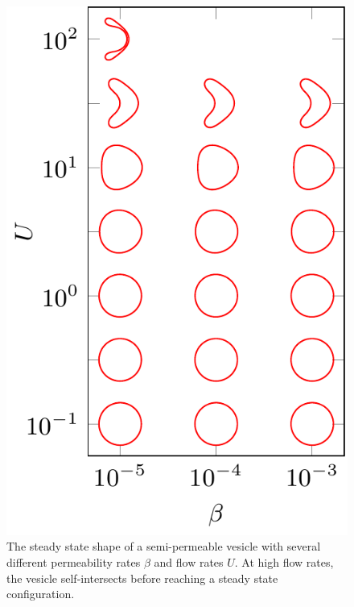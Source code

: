 \documentclass[9pt,twocolumn,twoside,lineno]{pnas-new}
\newif\ifTikz
\begin{document}
\begin{figure}[htp]
%  
  \includegraphics[width=0.8\linewidth]{figures/parabolicPhaseDiagram.pdf}
  \caption{\label{fig:parabolicPhaseDiagram} The steady state shape of a
  semi-permeable vesicle with several different permeability rates
  $\beta$ and flow rates $U$. At high flow rates, the vesicle
  self-intersects before reaching a steady state configuration.}
\end{figure}
\end{document}
